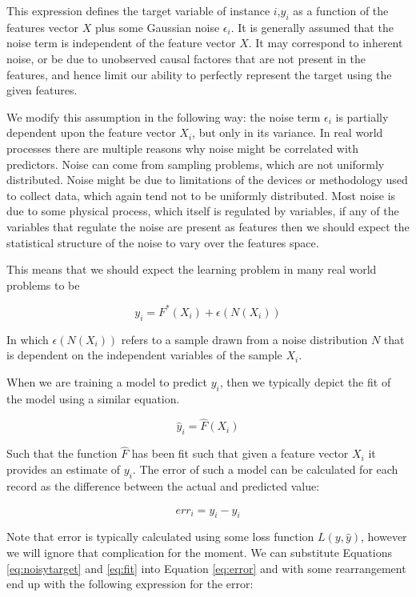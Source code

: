 \documentclass[12pt,a4paper]{article}
\begin{document}
This expression defines the target variable of instance $i$,$y_i$ as a function of the features vector $X$
plus some Gaussian noise $\epsilon_i$. It is generally assumed that the noise term is independent of the 
feature vector $X$. It may correspond to inherent noise, or be due to unobserved causal factores that are
not present in the features, and hence limit our ability to perfectly represent the target using the given
features.
 
We modify this assumption in the following way: the noise term $\epsilon_i$ is partially dependent upon the
feature vector $X_i$, but only in its variance. In real world processes there are multiple reasons
why noise might be correlated with predictors. Noise can come from sampling problems,
which are not uniformly distributed. Noise might be due to limitations of the devices
or methodology used to collect data, which again tend not to be uniformly distributed.
Most noise is due to some physical process, which itself is regulated by variables,
if any of the variables that regulate the noise are present as features then we should 
expect the statistical structure of the noise to vary over the features space.

This means that we should expect the learning problem in many real world problems to be

\begin{equation}
y_i = F^*(X_i) + \epsilon(N(X_i))
\label{eq:noisytarget}
\end{equation}

In which $\epsilon(N(X_i))$ refers to a sample drawn from a noise distribution $N$ that is
dependent on the independent variables of the sample $X_i$.

When we are training a model to predict $y_i$, then we typically depict the fit of the model
using a similar equation.

\begin{equation}
\hat{y}_i = \hat{F}(X_i)
\label{eq:fit}
\end{equation}

Such that the function $\hat{F}$ has been fit such that given a feature vector $X_i$ it provides an estimate of $y_i$.
The error of such a model can be calculated for each record as the difference between the actual and predicted value:

\begin{equation}
err_i = y_i - \hat{y}_i
\label{eq:error}
\end{equation}

Note that error is typically calculated using some loss function $L(y,\hat{y})$, however we will ignore that complication for the moment.
We can substitute Equations \ref{eq:noisytarget} and \ref{eq:fit} into Equation \ref{eq:error} and with some rearrangement end up
with the following expression for the error:
\end{document}
